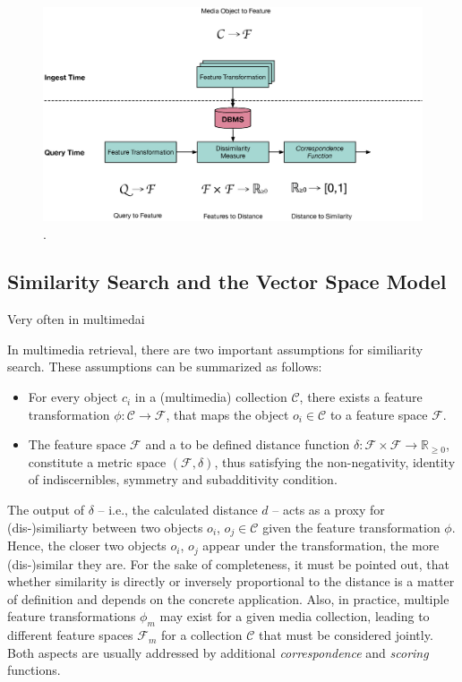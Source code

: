 \begin{figure}[bt]
    \centering
    \includegraphics[width=\textwidth]{figures/multimedia-retrieval-pipeline}
    \caption{.}
    \label{figure:multimedia_retrieval_flow}
\end{figure}

\subsection{Similarity Search and the Vector Space Model}

Very often in multimedai

In multimedia retrieval, there are two important assumptions for similiarity search. These assumptions can be summarized as follows:

\begin{itemize}
    \item For every object $c_{i}$ in a (multimedia) collection $\mathcal{C}$, there exists a feature transformation $\phi \colon \mathcal{C} \to \mathcal{F}$, that maps the object $o_{i} \in \mathcal{C}$ to a feature space $\mathcal{F}$.
    \item The feature space $\mathcal{F}$ and a to be defined distance function $\delta \colon \mathcal{F} \times \mathcal{F} \to \mathbb{R}_{\geq 0}$, constitute a metric space $(\mathcal{F},\delta)$, thus satisfying the non-negativity, identity of indiscernibles, symmetry and subadditivity condition.
\end{itemize}

The output of $\delta$ -- i.e., the calculated distance $d$ -- acts as a proxy for (dis-)similiarty between two objects $o_{i}$, $o_{j} \in \mathcal{C}$ given the feature transformation $\phi$. Hence, the closer two objects $o_{i}$, $o_{j}$ appear under the transformation, the more (dis-)similar they are. For the sake of completeness, it must be pointed out, that whether similarity is directly or inversely proportional to the distance is a matter of definition and depends on the concrete application. Also, in practice, multiple feature transformations $\phi_m$ may exist for a given media collection, leading to different feature spaces $\mathcal{F}_m$ for a collection $\mathcal{C}$ that must be considered jointly. Both aspects are usually addressed by additional \emph{correspondence} and \emph{scoring} functions.

